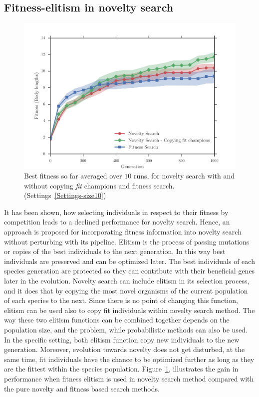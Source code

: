 \subsection*{Fitness-elitism in novelty search}

\begin{figure}[t!]
\centering
\includegraphics[width=1.0\textwidth]{../Figures/Results/CopyFitChampions10.pdf}
\caption{Best fitness so far averaged over $10$ runs, for novelty search with and without copying \emph{fit} champions and fitness search. (Settings~\ref{Settings-size10})}
\label{fig:CopyFitChampions10}
\end{figure}

It has been shown, how selecting individuals in respect to their fitness by competition leads to a declined performance for novelty search. Hence, an approach is proposed for incorporating fitness information into novelty search without perturbing with its pipeline. Elitism is the process of passing mutations or copies of the best individuals to the next generation. In this way best individuals are preserved and can be optimized later. The best individuals of each species generation are protected so they can contribute with their beneficial genes later in the evolution. Novelty search can include elitism in its selection process, and it does that by copying the most novel organisms of the current population of each species to the next. Since there is no point of changing this function, elitism can be used also to copy fit individuals within novelty search method. The way these two elitism functions can be combined together depends on the population size, and the problem, while probabilistic methods can also be used. In the specific setting, both elitism function copy new individuals to the new generation. Moreover, evolution towards novelty does not get disturbed, at the same time, fit individuals have the chance to be optimized further as long as they are the fittest within the species population. Figure~\ref{fig:CopyFitChampions10}, illustrates the gain in performance when fitness elitism is used in novelty search method compared with the pure novelty and fitness based search methods.



